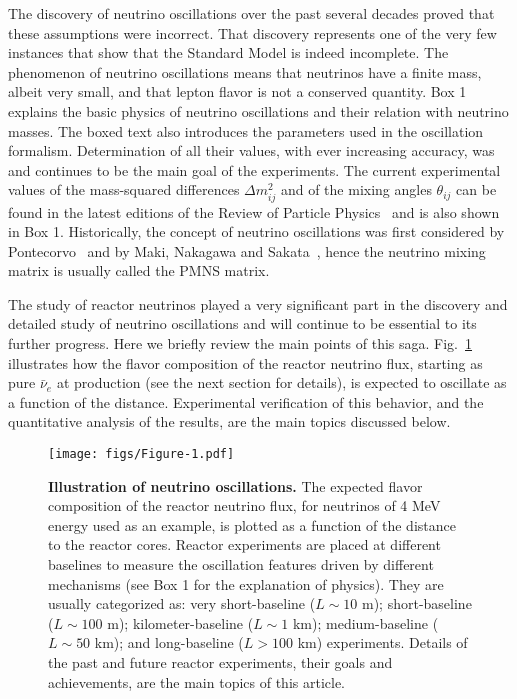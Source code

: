 \documentclass[aps,twocolumn,preprintnumbers,amsmath,superscriptaddress,amssymb,floats,nofootinbib]{revtex4-1}
\begin{document}
The discovery of neutrino oscillations over the past several decades
proved that these assumptions were incorrect. That discovery
represents one of the very few instances that show that 
the Standard Model is indeed incomplete. 
The phenomenon of neutrino oscillations means that
neutrinos have a finite mass, albeit very small, and that lepton flavor is not a conserved quantity.
Box 1 explains the basic physics of neutrino oscillations and their relation with neutrino masses. The boxed text
also introduces the parameters used in the oscillation formalism. Determination of all their values,
with ever increasing accuracy,
was and continues to be the main goal of the experiments.
The current experimental values of the mass-squared differences $\Delta m^2_{ij}$ and of the mixing angles $\theta_{ij}$ can be found
in the latest editions of the Review of Particle Physics~\cite{PDG14} and is also shown in Box 1.
Historically, the concept of neutrino oscillations was first considered by Pontecorvo~\cite{Pontecorvo57, Pontecorvo58}
and by Maki, Nakagawa and Sakata~\cite{MNS62}, hence the neutrino mixing matrix is usually called the PMNS matrix.

The study of reactor neutrinos played a very significant part in the discovery and detailed study of neutrino oscillations and will continue 
to be essential to its further progress. Here we briefly review
the main points of this saga. Fig.~\ref{fig:intro1} illustrates how the flavor composition of the reactor neutrino flux, starting as pure $\bar\nu_e$ at production (see the next section for details), is expected to oscillate as a function of the distance.
Experimental verification of this behavior, and the quantitative analysis of the results, are the main topics discussed below.

\begin{figure}[tb]
\begin{centering}
\texttt{[image: figs/Figure-1.pdf]}
\par\end{centering}
\caption{\label{fig:intro1} {\bf Illustration of neutrino oscillations.} The expected flavor composition of the reactor neutrino flux, for neutrinos of 4 MeV energy
used as an example, is plotted as a function of the distance to the reactor cores. Reactor experiments are placed at different baselines 
to measure the oscillation features driven by different mechanisms  (see Box 1 for the explanation of physics). They are usually categorized as: very short-baseline ($L\sim10$ m); short-baseline ($L\sim100$ m); kilometer-baseline ($L\sim1$ km); medium-baseline ($L\sim50$ km); and long-baseline ($L>100$ km) experiments. Details of the past and future reactor experiments, their goals and achievements, are the main topics of this article.
}
\end{figure}
\end{document}
